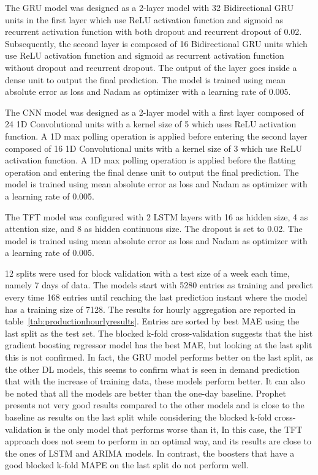 The GRU model was designed as a 2-layer model with 32 Bidirectional GRU units in the first layer which use ReLU activation function and sigmoid as recurrent activation function with both dropout and recurrent dropout of 0.02.
Subsequently, the second layer is composed of 16 Bidirectional GRU units which use ReLU activation function and sigmoid as recurrent activation function without dropout and recurrent dropout.
The output of the layer goes inside a dense unit to output the final prediction.
The model is trained using mean absolute error as loss and Nadam as optimizer with a learning rate of 0.005.

The CNN model was designed as a 2-layer model with a first layer composed of 24 1D Convolutional units with a kernel size of 5 which uses ReLU activation function.
A 1D max polling operation is applied before entering the second layer composed of 16 1D Convolutional units with a kernel size of 3 which use ReLU activation function.
A 1D max polling operation is applied before the flatting operation and entering the final dense unit to output the final prediction.
The model is trained using mean absolute error as loss and Nadam as optimizer with a learning rate of 0.005.

The TFT model was configured with 2 LSTM layers with 16 as hidden size, 4 as attention size, and 8 as hidden continuous size.
The dropout is set to 0.02.
The model is trained using mean absolute error as loss and Nadam as optimizer with a learning rate of 0.005.

12 splits were used for block validation with a test size of a week each time, namely 7 days of data.
The models start with 5280 entries as training and predict every time 168 entries until reaching the last prediction instant where the model has a training size of 7128.
The results for hourly aggregation are reported in table~\ref{tab:productionhourlyresults}.
Entries are sorted by best MAE using the last split as the test set.
The blocked k-fold cross-validation suggests that the hist gradient boosting regressor model has the best MAE, but looking at the last split this is not confirmed.
In fact, the GRU model performs better on the last split, as the other DL models, this seems to confirm what is seen in demand prediction that with the increase of training data, these models perform better.
It can also be noted that all the models are better than the one-day baseline.
Prophet presents not very good results compared to the other models and is close to the baseline as results on the last split while considering the blocked k-fold cross-validation is the only model that performs worse than it,
In this case, the TFT approach does not seem to perform in an optimal way, and its results are close to the ones of LSTM and ARIMA models.
In contrast, the boosters that have a good blocked k-fold MAPE on the last split do not perform well.

